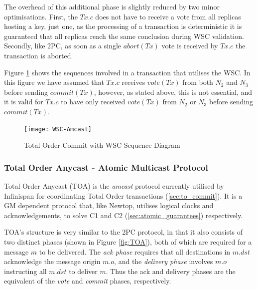			The overhead of this additional phase is slightly reduced by two minor optimisations.  First, the $Tx.c$ does not have to receive a vote from all replicas hosting a key, just one, as the processing of a transaction is deterministic it is guaranteed that all replicas reach the same conclusion during WSC validation.  Secondly, like 2PC, as soon as a single $abort(Tx)$ vote is received by $Tx.c$ the transaction is aborted.  
			
			Figure \ref{fig:total_order_wsc} shows the sequences involved in a transaction that utilises the WSC.  In this figure we have assumed that $Tx.c$ receives $vote(Tx)$ from both $N_2$ and $N_3$ before sending $commit(Tx)$, however, as stated above, this is not essential, and it is valid for $Tx.c$ to have only received $vote(Tx)$ from $N_2$ or $N_3$ before sending $commit(Tx)$.  
	        
	        \begin{figure}[htbp!] 
                \centering    
                \texttt{[image: WSC-Amcast]}
                \caption[Total Order Commit with Write Skew Check]{Total Order Commit with WSC Sequence Diagram}
                \label{fig:total_order_wsc}
            \end{figure}	      	                         
             
	        \subsubsection{Total Order Anycast - Atomic Multicast Protocol} \label{ssec:TOA_limations}
	        Total Order Anycast (TOA)\cite{Ruivo:2011:ETO:2120967.2121604} is the \emph{amcast} protocol currently utilised by Infinispan for coordinating Total Order transactions (\ref{sec:to_commit}).  It is a GM dependent protocol that, like Newtop\citep{Ezhilchelvan:1995:NFG:876885.880005}, utilises logical clocks and acknowledgements, to solve C1 and C2 (\ref{sec:atomic_guarantees}) respectively.  
	        
			TOA's structure is very similar to the 2PC protocol, in that it also consists of two distinct phases (shown in Figure \ref{fig:TOA}), both of which are required for a message $m$ to be delivered.  The \emph{ack phase} requires that all destinations in $m.dst$ acknowledge the message origin $m.o$, and the \emph{delivery phase} involves $m.o$ instructing all $m.dst$ to deliver $m$.  Thus the ack and delivery phases are the equivalent of the \emph{vote} and \emph{commit} phases, respectively.  
	        
